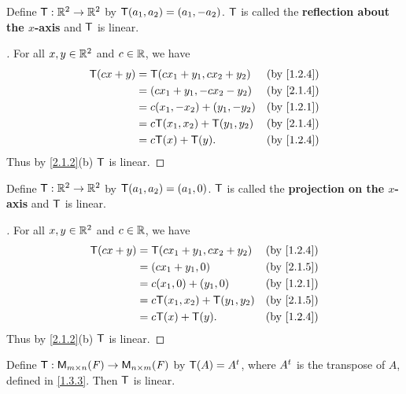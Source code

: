 \begin{eg}\label{2.1.4}
  Define \(\mathsf{T} : \mathbb{R}^2 \to \mathbb{R}^2\) by \(\mathsf{T}(a_1, a_2) = (a_1, -a_2)\).
  \(\mathsf{T}\) is called the \textbf{reflection about the \(x\)-axis} and \(\mathsf{T}\) is linear.
\end{eg}

\begin{proof}[]
  For all \(x, y \in \mathbb{R}^2\) and \(c \in \mathbb{R}\), we have
  \begin{align*}
    \T(cx + y) & = \T(cx_1 + y_1, cx_2 + y_2)   &  & \by{1.2.4} \\
               & = (cx_1 + y_1, -cx_2 - y_2)    &  & \by{2.1.4} \\
               & = c(x_1, -x_2) + (y_1, -y_2)   &  & \by{1.2.1} \\
               & = c\T(x_1, x_2) + \T(y_1, y_2) &  & \by{2.1.4} \\
               & = c\T(x) + \T(y).              &  & \by{1.2.4}
  \end{align*}
  Thus by \cref{2.1.2}(b) \(\mathsf{T}\) is linear.
\end{proof}

\begin{eg}\label{2.1.5}
  Define \(\mathsf{T} : \mathbb{R}^2 \to \mathbb{R}^2\) by \(\mathsf{T}(a_1, a_2) = (a_1, 0)\).
  \(\mathsf{T}\) is called the \textbf{projection on the \(x\)-axis} and \(\mathsf{T}\) is linear.
\end{eg}

\begin{proof}[]
  For all \(x, y \in \mathbb{R}^2\) and \(c \in \mathbb{R}\), we have
  \begin{align*}
    \T(cx + y) & = \T(cx_1 + y_1, cx_2 + y_2)   &  & \by{1.2.4} \\
               & = (cx_1 + y_1, 0)              &  & \by{2.1.5} \\
               & = c(x_1, 0) + (y_1, 0)         &  & \by{1.2.1} \\
               & = c\T(x_1, x_2) + \T(y_1, y_2) &  & \by{2.1.5} \\
               & = c\T(x) + \T(y).              &  & \by{1.2.4}
  \end{align*}
  Thus by \cref{2.1.2}(b) \(\mathsf{T}\) is linear.
\end{proof}

\begin{eg}\label{2.1.6}
  Define \(\T : \ms[m][n][\F] \to \ms[n][m][\F]\) by \(\mathsf{T}(A) = {A}^{t}\), where \({A}^{t}\) is the transpose of \(A\), defined in \cref{1.3.3}.
  Then \(\mathsf{T}\) is linear.
\end{eg}

